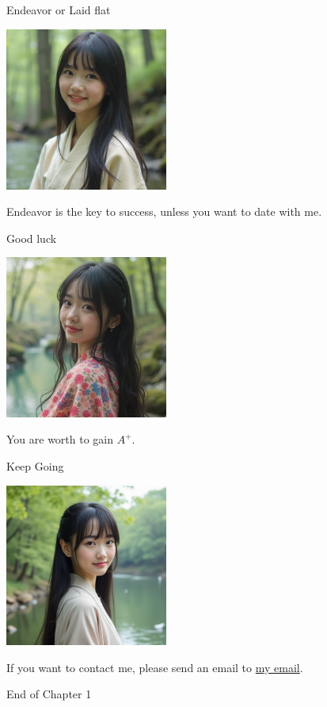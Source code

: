 \documentclass{beamer}
\begin{document}
\begin{frame}{Endeavor or Laid flat}
\begin{center}
\includegraphics[width=0.4\textwidth]{fail.png}
\end{center}
\begin{center}
Endeavor is the key to success, unless you want to date with me.
\end{center}
\end{frame}
\begin{frame}{Good luck}
\begin{center}
\includegraphics[width=0.4\textwidth]{good_luck.png}
\end{center}
\begin{center}
You are worth to gain $A^+$.
\end{center}
\end{frame}
\begin{frame}{Keep Going}
\begin{center}
\includegraphics[width=0.4\textwidth]{kg.png}
\end{center}
\begin{center}
If you want to contact me, please send an email to \href{mailto:politics-tchsiao@gmail.com}{my email}.
\end{center}
\end{frame}
\begin{frame}{}
\begin{center}
\Large{End of Chapter 1}
\end{center}
\end{frame}
\end{document}
